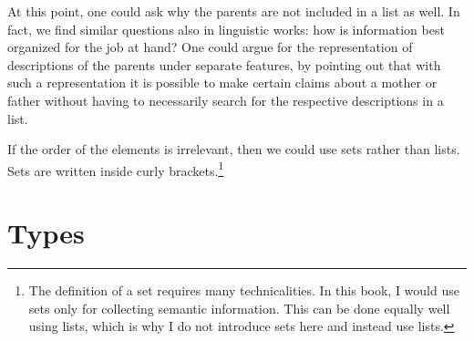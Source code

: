 \begin{figure}[tb]
\ea
{}
\z
\vspace{-\baselineskip}
\end{figure}%
At this point, one could ask why the parents are not included in a list as well. In fact, we find similar questions also
in linguistic works: how is information best organized for the job at hand? One could argue for the
representation of descriptions of the parents under separate features, by pointing out that with
such a representation it is possible to make certain claims about a mother or father without having to necessarily
search for the respective descriptions in a list.

If the order of the elements is irrelevant, then we could use sets rather than lists.
Sets are written inside curly brackets.\footnote{%
The definition of a set requires many technicalities. 
In this book, I would use sets only for collecting semantic information. This can be done equally
well using lists, which is why I do not introduce sets here and instead use lists.%
}

\section{Types}
\label{sec-formalismus-typen}

